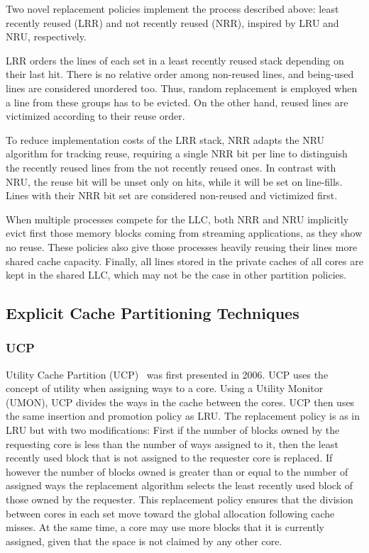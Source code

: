 Two novel replacement policies implement the process described above: least recently reused (LRR) and not recently reused (NRR), inspired by LRU and NRU, respectively. 

LRR orders the lines of each set in a least recently reused stack depending on their last hit. 
There is no relative order among non-reused lines, and being-used lines are considered unordered too. 
Thus, random replacement is employed when a line from these groups has to be evicted. 
On the other hand, reused lines are victimized according to their reuse order. 

To reduce implementation costs of the LRR stack, NRR adapts the NRU algorithm for tracking reuse, requiring a single NRR bit per line to distinguish the recently reused lines from the not recently reused ones.
In contrast with NRU, the reuse bit will be unset only on hits, while it will be set on line-fills. 
Lines with their NRR bit set are considered non-reused and victimized first.

When multiple processes compete for the LLC, both NRR and NRU implicitly evict first those memory blocks coming from streaming applications, as they show no reuse. 
These policies also give those processes heavily reusing their lines more shared cache capacity.
Finally, all lines stored in the private caches of all cores are kept in the shared LLC, which may not be the case in other partition policies.

\subsection{Explicit Cache Partitioning Techniques}

\subsubsection{UCP}

Utility Cache Partition (UCP)~\cite{Qureshi2006} was first presented in 2006. 
UCP uses the concept of utility when assigning ways to a core.
Using a Utility Monitor (UMON), UCP divides the ways in the cache between the cores.
UCP then uses the same insertion and promotion policy as LRU.
The replacement policy is as in LRU but with two modifications:
First if the number of blocks owned by the requesting core is less than the number of ways assigned to it, then the least recently used block that is not assigned to the requester core is replaced.
If however the number of blocks owned is greater than or equal to the number of assigned ways the replacement algorithm selects the least recently used block of those owned by the requester.
This replacement policy ensures that the division between cores in each set move toward the global allocation following cache misses.
At the same time, a core may use more blocks that it is currently assigned, given that the space is not claimed by any other core.

